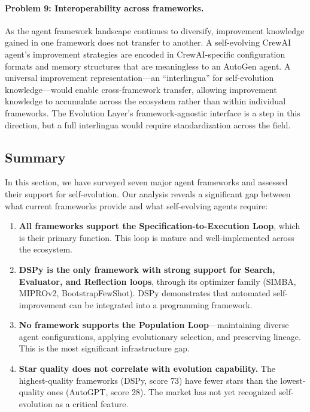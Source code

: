 \paragraph{Problem 9: Interoperability across frameworks.}
As the agent framework landscape continues to diversify, improvement knowledge gained in one framework does not transfer to another. A self-evolving CrewAI agent's improvement strategies are encoded in CrewAI-specific configuration formats and memory structures that are meaningless to an AutoGen agent. A universal improvement representation---an ``interlingua'' for self-evolution knowledge---would enable cross-framework transfer, allowing improvement knowledge to accumulate across the ecosystem rather than within individual frameworks. The Evolution Layer's framework-agnostic interface is a step in this direction, but a full interlingua would require standardization across the field.


\subsection{Summary}

In this section, we have surveyed seven major agent frameworks and assessed their support for self-evolution. Our analysis reveals a significant gap between what current frameworks provide and what self-evolving agents require:

\begin{enumerate}
    \item \textbf{All frameworks support the Specification-to-Execution Loop}, which is their primary function. This loop is mature and well-implemented across the ecosystem.

    \item \textbf{DSPy is the only framework with strong support for Search, Evaluator, and Reflection loops}, through its optimizer family (SIMBA, MIPROv2, BootstrapFewShot). DSPy demonstrates that automated self-improvement can be integrated into a programming framework.

    \item \textbf{No framework supports the Population Loop}---maintaining diverse agent configurations, applying evolutionary selection, and preserving lineage. This is the most significant infrastructure gap.

    \item \textbf{Star quality does not correlate with evolution capability.} The highest-quality frameworks (DSPy, score 73) have fewer stars than the lowest-quality ones (AutoGPT, score 28). The market has not yet recognized self-evolution as a critical feature.
\end{enumerate}

